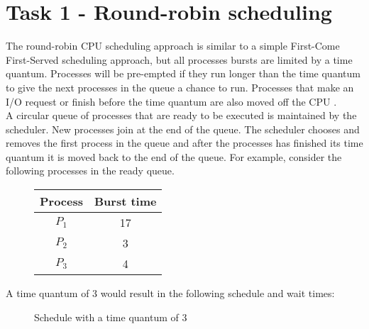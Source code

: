 \documentclass{article}
\newcommand{\n}[0]{\\[\baselineskip]}
\begin{document}
\section{Task 1 - Round-robin scheduling}
The round-robin CPU scheduling approach is similar to a simple First-Come First-Served scheduling approach, but all processes bursts are limited by a time quantum. Processes will be pre-empted if they run longer than the time quantum to give the next processes in the queue a chance to run. Processes that make an I/O request or finish before the time quantum are also moved off the CPU \cite{rr-paper}.
\n
A circular queue of processes that are ready to be executed is maintained by the scheduler. New processes join at the end of the queue. The scheduler chooses and removes the first process in the queue and after the processes has finished its time quantum it is moved back to the end of the queue. For example, consider the following processes in the ready queue.
\n
\begin{figure}[H]
\centering
\begin{tabular}{c c}
\textbf{Process} & \textbf{Burst time} \\
\hline
$P_{1}$ & 17 \\
$P_{2}$ & 3 \\
$P_{3}$ & 4 \\
\end{tabular}
\end{figure}
\noindent 
A time quantum of 3 would result in the following schedule and wait times:
\begin{figure}[H]
\centering
{}
\caption{Schedule with a time quantum of 3}
\end{figure}
\end{document}
